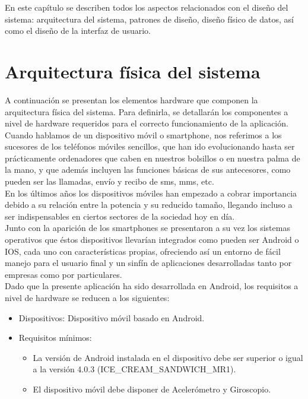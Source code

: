 

En este capítulo se describen todos los aspectos relacionados con el diseño del sistema: arquitectura del sistema, patrones de diseño, diseño físico de datos, así como el diseño de la interfaz de usuario.

\section{Arquitectura física del sistema}

A continuación se presentan los elementos hardware que componen la arquitectura física del sistema. Para definirla, se detallarán los componentes a nivel de hardware requeridos para el correcto funcionamiento de la aplicación.\\

Cuando hablamos de un dispositivo móvil o smartphone, nos referimos a los sucesores de los teléfonos móviles sencillos, que han ido evolucionando hasta ser prácticamente ordenadores que caben en nuestros bolsillos o en nuestra palma de la mano, y que además incluyen las funciones básicas de sus antecesores, como pueden ser las llamadas, envío y recibo de sms, mms, etc.\\

En los últimos años los dispositivos móviles han empezado a cobrar importancia debido a su relación entre la potencia y su reducido tamaño, llegando incluso a ser indispensables en ciertos sectores de la sociedad hoy en día.\\

Junto con la aparición de los smartphones se presentaron a su vez los sistemas operativos que éstos dispositivos llevarían integrados como pueden ser Android o IOS, cada uno con características propias, ofreciendo así un entorno de fácil manejo para el usuario final y un sinfín de aplicaciones desarrolladas tanto por empresas como por particulares.\\

Dado que la presente aplicación ha sido desarrollada en Android, los requisitos a nivel de hardware se reducen a los siguientes:

\begin{itemize}
\item Dispositivos: Dispositivo móvil basado en Android.
\item Requisitos mínimos:
\begin{itemize}
\item La versión de Android instalada en el dispositivo debe ser superior o igual a la versión 4.0.3 (ICE\_CREAM\_SANDWICH\_MR1).
\item El dispositivo móvil debe disponer de Acelerómetro y Giroscopio.
\end{itemize}
\end{itemize}

